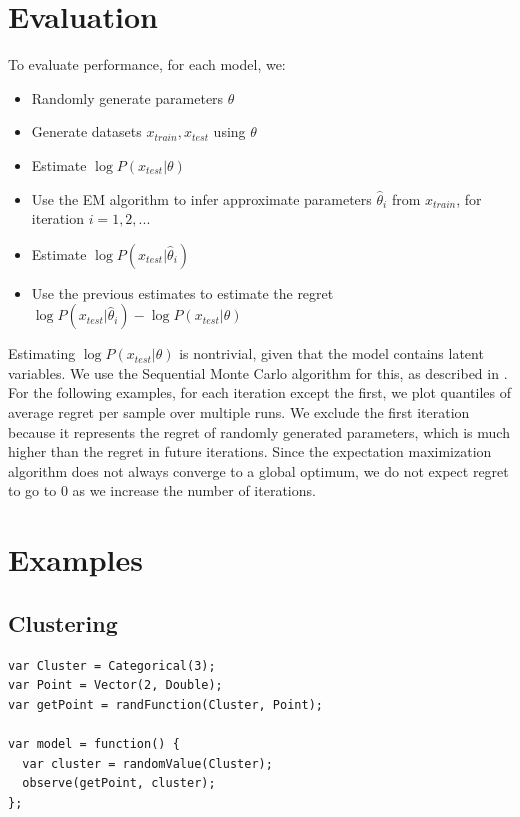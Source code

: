 \documentclass{article}
\begin{document}
  \section{Evaluation}

    To evaluate performance, for each model, we:
    \begin{itemize}
      \item
        Randomly generate parameters $\theta$
      \item
        Generate datasets $x_{train}, x_{test}$ using $\theta$
      \item
        Estimate $\log P(x_{test} | \theta)$
      \item
        Use the EM algorithm to infer approximate parameters $\hat{\theta}_i$ from $x_{train}$, for iteration $i = 1, 2, ...$
      \item
        Estimate $\log P(x_{test} | \hat{\theta}_i)$
      \item
        Use the previous estimates to estimate the regret $\log P(x_{test} | \hat{\theta}_i) - \log P(x_{test} | \theta)$
    \end{itemize}
    Estimating $\log P(x_{test} | \theta)$ is nontrivial, given that the model contains latent variables.
    We use the Sequential Monte Carlo algorithm for this, as described in \cite{dippl}.  For the following examples,
    for each iteration except the first, we plot quantiles of average regret per sample over multiple runs.  We exclude
    the first iteration because it represents the regret of randomly generated parameters, which is much higher than the regret in future iterations.  Since
    the expectation maximization algorithm does not always converge to a global optimum, we do not expect regret
    to go to 0 as we increase the number of iterations.


  \section{Examples}

  \subsection{Clustering}

{\small
\begin{lstlisting}
var Cluster = Categorical(3);
var Point = Vector(2, Double);
var getPoint = randFunction(Cluster, Point);

var model = function() {
  var cluster = randomValue(Cluster);
  observe(getPoint, cluster);
};
\end{lstlisting}
}
\end{document}
